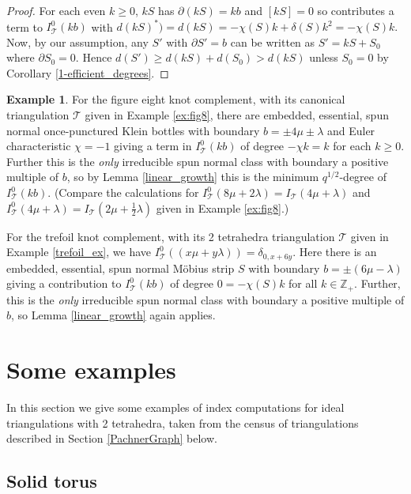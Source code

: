 \documentclass[12pt,reqno]{amsart}  %
\theoremstyle{definition}
\newtheorem{ex}[thm]{Example}
\theoremstyle{remark}
\newcommand{\CT}{\mathcal{T}}
\newcommand{\T}{\mathcal{T}}
\def\Z{\mathbb Z}
\def\bd{\partial}
\begin{document}
\begin{proof} 
For each even $k\ge 0$, $k S$ has $\bd(k S) = k b$ and $[k S]=0$ so 
contributes a term to  $I^0_\T(kb)$
with $d(kS)^*)= d(kS) = -\chi(S)k+\delta(S)k^2 = -\chi(S)k.$ 
Now, by our assumption, any $S'$ with $\bd S'=b$ can be written as 
$S'=kS + S_0$ where $\bd S_0=0$. Hence $d(S') \ge d(kS) + d(S_0) > d(kS)$ 
unless $S_0=0$ by Corollary \ref{1-efficient_degrees}. 
\end{proof}

\begin{ex}
For the figure eight knot complement, with its canonical triangulation 
$\T$ given in Example \ref{ex:fig8}, there are embedded, essential, 
spun normal once-punctured Klein bottles with boundary
$b = \pm 4 \mu \pm \lambda$ and Euler characteristic $\chi= -1$ giving 
a term in $I^0_\T(k b)$ of degree $-\chi k =k$ for each $k \ge 0$. Further 
this is the {\em only} irreducible spun  normal class
with boundary a positive multiple of $b$, so by Lemma \ref{linear_growth}
this is the minimum $q^{1/2}$-degree of $I^0_\T(k b)$.
(Compare the calculations for 
$I_\T^0(8\mu+2\lambda) = I_{\CT}(4\mu+\lambda )$ and 
$I_\T^0(4\mu+\lambda )= I_{\CT}(2\mu+\frac{1}{2} \lambda)$
given in Example \ref{ex:fig8}.)

For the trefoil knot complement, with its 2 tetrahedra triangulation $\T$ 
given in Example \ref{trefoil_ex}, 
we have $I^0_\T((x \mu + y \lambda)) =  \delta_{0,x+6y}$.
Here there is an embedded, essential, spun normal M\"obius strip $S$ with 
boundary $b= \pm(6 \mu - \lambda)$
giving a contribution to  $I^0_\T(k b)$ of degree $0 = -\chi(S)k$ for all 
$k \in \Z_+$. Further, this is the {\em only} irreducible spun  normal class
with boundary a positive multiple of $b$, so  Lemma \ref{linear_growth} 
again applies.
\end{ex}


\section{Some examples}

In this section we give some examples of index computations for ideal 
triangulations with 2 tetrahedra, taken from the census
of triangulations described in Section \ref{PachnerGraph} below.

\subsection{Solid torus}
\label{solid_torus_ex}
\end{document}
